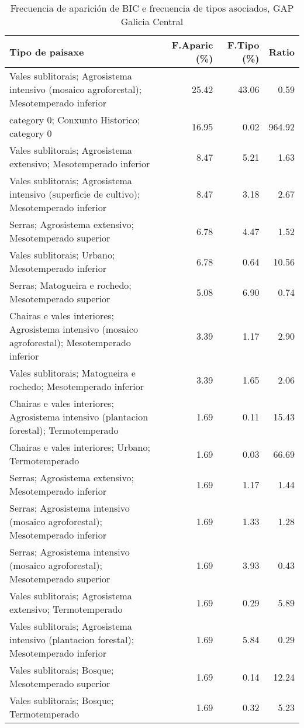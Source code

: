 \begin{table}[p]
\centering
\caption{Frecuencia de aparición de BIC e frecuencia de tipos asociados, GAP Galicia Central} 
\label{vbic7}
\begin{tabular}{lrrr}
  \hline
Tipo de paisaxe & F.Aparic (\%) & F.Tipo (\%) & Ratio \\ 
  \hline
Vales sublitorais; Agrosistema intensivo (mosaico agroforestal); Mesotemperado inferior & 25.42 & 43.06 & 0.59 \\ 
  category 0; Conxunto Historico; category 0 & 16.95 & 0.02 & 964.92 \\ 
  Vales sublitorais; Agrosistema extensivo; Mesotemperado inferior & 8.47 & 5.21 & 1.63 \\ 
  Vales sublitorais; Agrosistema intensivo (superficie de cultivo); Mesotemperado inferior & 8.47 & 3.18 & 2.67 \\ 
  Serras; Agrosistema extensivo; Mesotemperado superior & 6.78 & 4.47 & 1.52 \\ 
  Vales sublitorais; Urbano; Mesotemperado inferior & 6.78 & 0.64 & 10.56 \\ 
  Serras; Matogueira e rochedo; Mesotemperado superior & 5.08 & 6.90 & 0.74 \\ 
  Chairas e vales interiores; Agrosistema intensivo (mosaico agroforestal); Mesotemperado inferior & 3.39 & 1.17 & 2.90 \\ 
  Vales sublitorais; Matogueira e rochedo; Mesotemperado inferior & 3.39 & 1.65 & 2.06 \\ 
  Chairas e vales interiores; Agrosistema intensivo (plantacion forestal); Termotemperado & 1.69 & 0.11 & 15.43 \\ 
  Chairas e vales interiores; Urbano; Termotemperado & 1.69 & 0.03 & 66.69 \\ 
  Serras; Agrosistema extensivo; Mesotemperado inferior & 1.69 & 1.17 & 1.44 \\ 
  Serras; Agrosistema intensivo (mosaico agroforestal); Mesotemperado inferior & 1.69 & 1.33 & 1.28 \\ 
  Serras; Agrosistema intensivo (mosaico agroforestal); Mesotemperado superior & 1.69 & 3.93 & 0.43 \\ 
  Vales sublitorais; Agrosistema extensivo; Termotemperado & 1.69 & 0.29 & 5.89 \\ 
  Vales sublitorais; Agrosistema intensivo (plantacion forestal); Mesotemperado inferior & 1.69 & 5.84 & 0.29 \\ 
  Vales sublitorais; Bosque; Mesotemperado superior & 1.69 & 0.14 & 12.24 \\ 
  Vales sublitorais; Bosque; Termotemperado & 1.69 & 0.32 & 5.23 \\ 
   \hline
\end{tabular}
\end{table}
